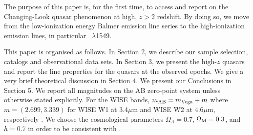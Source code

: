 \documentclass[a4paper,fleqn,usenatbib]{mnras}
\begin{document}
The purpose of this paper is, for the first time, to access and 
report on the Changing-Look quasar phenomenon at high, 
$z>2$ redshift. By doing so, we move from the low-ionization 
energy Balmer emission line series to the high-ionization emission 
lines, in particular \civ\ $\lambda$1549. 

This paper is organised as follows. In Section 2, we describe our
sample selection, catalogs and observational data sets.  In Section 3,
we present the high-$z$ quasars and report the line properties for the
quasars at the observed epochs.  We give a very brief theoretical
discussion in Section 4. We present our Conclusions in Section 5.  We
report all magnitudes on the AB zero-point system \citep{Oke_Gunn1983,
Fukugita1996} unless otherwise stated explicitly. For the WISE bands,
$m_{\rm AB} = m_{\rm Vega} + m$ where $m = (2.699, 3.339)$ for WISE W1
at 3.4$\mu$m and WISE W2 at 4.6$\mu$m, respectively
\citep{Cutri2011}. We choose the cosmological parameters
$\Omega_{\Lambda} = 0.7$, $\Omega_{\rm M} = 0.3$, and $h = 0.7$ in
order to be consistent with \citet{Shen2011}.
\end{document}
